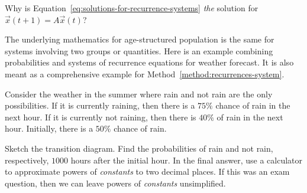 \documentclass[../main.tex]{subfiles}
\begin{document}
Why is Equation~\eqref{eq:solutions-for-recurrence-systems} \emph{the} solution for \(\vec{x}(t+1) = A \vec{x}(t)\)? 

The underlying mathematics for age-structured population is the same for systems involving two groups or quantities. Here is an example combining probabilities and systems of recurrence equations for weather forecast. It is also meant as a comprehensive example for Method~\ref{method:recurrences-system}. 

\begin{example}
  Consider the weather in the summer where rain and not rain are the only possibilities.  If it is currently raining, then there is a \(75\%\) chance of rain in the next hour. If it is currently not raining, then there is \(40\%\) of rain in the next hour.  Initially, there is a \(50\%\) chance of rain.  

  Sketch the transition diagram. Find the probabilities of rain and not rain, respectively, \(1000\) hours after the initial hour.  In the final answer, use a calculator to approximate powers of \emph{constants} to two decimal places. If this was an exam question, then we can leave powers of \emph{constants} unsimplified.

  \clearpage

\end{example}
\end{document}
